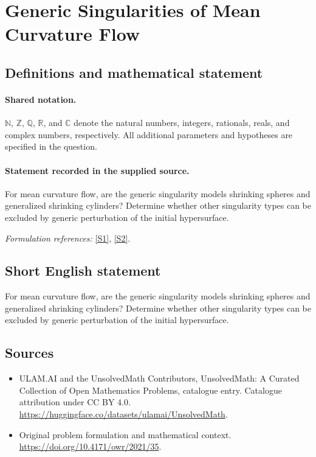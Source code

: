 \documentclass[11pt]{article}
\newcommand{\sref}[2]{\hyperlink{source:#1:#2}{[S#2]}}
\begin{document}
\section{Generic Singularities of Mean Curvature Flow}\label{statement}

\subsection{Definitions and mathematical statement}

\paragraph{Shared notation.}$\mathbb N$, $\mathbb Z$, $\mathbb Q$, $\mathbb R$, and $\mathbb C$ denote the natural numbers, integers, rationals, reals, and complex numbers, respectively. All additional parameters and hypotheses are specified in the question.


\paragraph{Statement recorded in the supplied source.}
For mean curvature flow, are the generic singularity models shrinking spheres and generalized shrinking cylinders? Determine whether other singularity types can be excluded by generic perturbation of the initial hypersurface.
\par\smallskip\textit{Formulation references:} \sref{statement}{1}, \sref{statement}{2}.
\subsection{Short English statement}
For mean curvature flow, are the generic singularity models shrinking spheres and generalized shrinking cylinders? Determine whether other singularity types can be excluded by generic perturbation of the initial hypersurface.
\subsection{Sources}
\begin{itemize}
\item[\hypertarget{source:statement:1}{S1}] ULAM.AI and the UnsolvedMath Contributors, UnsolvedMath: A Curated Collection of Open Mathematics Problems, catalogue entry. Catalogue attribution under CC BY 4.0.
\url{https://huggingface.co/datasets/ulamai/UnsolvedMath}.
\item[\hypertarget{source:statement:2}{S2}] Original problem formulation and mathematical context.
\url{https://doi.org/10.4171/owr/2021/35}.
\end{itemize}
\label{end:statement}
\end{document}
